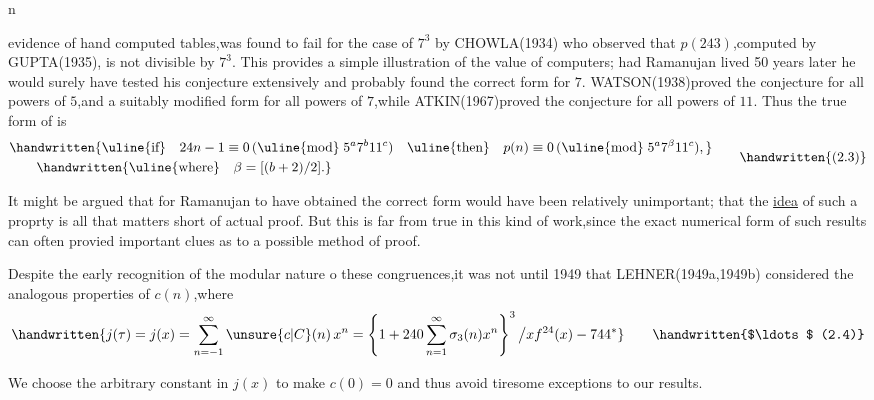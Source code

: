 \noindent\hfill {}n 

\noindent evidence of hand computed tables,was found to fail for the case of $7^{3}$ by CHOWLA(1934) who observed that $p(243)$,computed by GUPTA(1935), is not divisible by $7^{3}$. This provides a simple illustration of the value of computers; had Ramanujan lived 50 years later he would surely have tested his conjecture extensively and probably found the correct form for $7$. WATSON(1938)proved the conjecture for all powers of $5$,and a suitably modified form for all powers of $7$,while ATKIN(1967)proved the conjecture for all powers of $11$. Thus the true form of  is
\[
\begin{aligned}
&\handwritten{\text{\uline{if}}\quad 24n-1\equiv0\,(\text{\uline{mod}}\;5^{a}7^{b}11^{c})\quad
\text{\uline{then}}\quad p(n)\equiv0\,(\text{\uline{mod}}\;5^{a}7^{\beta}11^{c}),}\\
&\qquad\handwritten{\text{\uline{where}}\quad \beta=[(b+2)/2].}
\end{aligned}
\tag*{\handwritten{(2.3)}}
\]

It might be argued that for Ramanujan to have obtained the correct form would have been relatively unimportant; that the \uline{idea} of such a proprty is all that matters short of actual proof. But this is far from true in this kind of work,since the exact numerical form of such results can often provied important clues as to a possible method of proof.

Despite the early recognition of the modular nature o these congruences,it was not until 1949 that LEHNER(1949a,1949b) considered the analogous properties of $c(n)$,where
\[
\handwritten{j(\tau)=j(x)=\sum_{n=-1}^{\infty}\unsure{c|C}(n)\,x^{n}
=\left\{1+240\sum_{n=1}^{\infty}\sigma_{3}(n)x^{n}\right\}^{3}\big/xf^{24}(x)-744^{*}}
\tag*{\handwritten{$\ldots$ (2.4)}}
\]

\noindent\handwritten{\rule{\linewidth}{0.4pt}}

\noindent *We choose the arbitrary constant in $j(x)$ to make $c(0)=0$ and thus avoid tiresome exceptions to our results.

